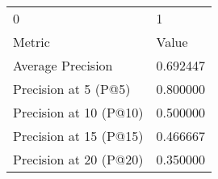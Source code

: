 \begin{tabular}{ll}
0 & 1 \\
Metric & Value \\
Average Precision & 0.692447 \\
Precision at 5 (P@5) & 0.800000 \\
Precision at 10 (P@10) & 0.500000 \\
Precision at 15 (P@15) & 0.466667 \\
Precision at 20 (P@20) & 0.350000 \\
\end{tabular}

